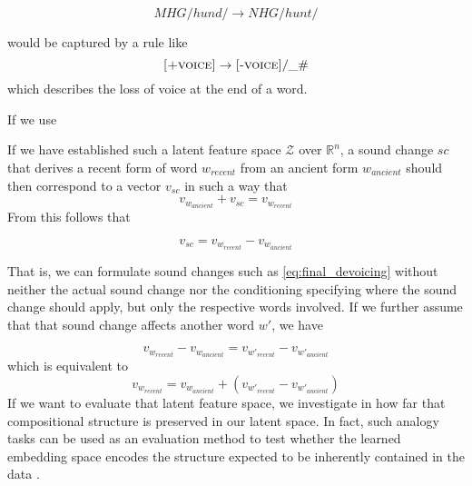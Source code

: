 \documentclass[8pt]{article}
\begin{document}
\begin{equation}
MHG /hund/ \rightarrow NHG /hunt/
\end{equation}

 would be captured by a rule like
\begin{equation}
\textsc{[+voice]} \rightarrow \textsc{[-voice]} / \_ \#
\label{eq:final_devoicing}
\end{equation}
which describes the loss of voice at the end of a word. 


If we use 

If we have established such a latent feature space $\mathcal{Z}$ over $\mathbb{R}^n$, a sound change $sc$ that derives a recent form of word $w_{recent}$ from an ancient form  $w_{ancient}$ should then correspond to a vector $v_{sc}$ in such a way that 
\begin{equation}
v_{w_{ancient}}+v_{sc} = v_{w_{recent}}
\end{equation}
From this follows that 

\begin{equation}
v_{sc} =  v_{w_{recent}} - v_{w_{ancient}} 
\end{equation}

That is, we can formulate sound changes such as \ref{eq:final_devoicing} without neither the actual sound change nor the conditioning specifying where the sound change should apply, but only the respective words involved.
If we further assume that that sound change affects another word $w'$, we have

\begin{equation}
v_{w_{recent}} - v_{w_{ancient}}  =  v_{w'_{recent}} - v_{w'_{ancient}} 
\end{equation}
which is equivalent to
\begin{equation}
v_{w_{recent}}  =   v_{w_{ancient}}  + (v_{w'_{recent}} - v_{w'_{ancient}}) 
\end{equation}
If we want to evaluate that latent feature space, we investigate in how far that compositional structure is preserved in our latent space. In fact, such analogy tasks can be used as an evaluation method to test whether the learned embedding space encodes the structure expected to be inherently contained in the data \cite{mikolov2013distributed}.
\end{document}

